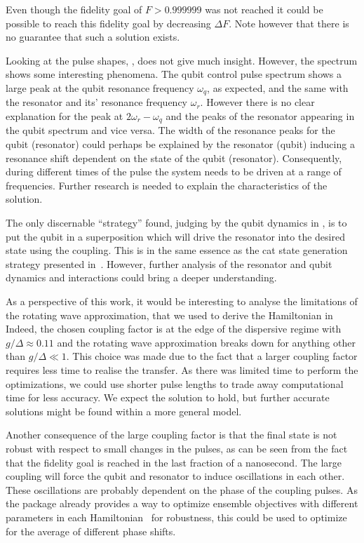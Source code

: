 \documentclass[main.tex]{subfiles}
\begin{document}
Even though the fidelity goal of \(F > 0.999999\) was not reached it could be possible to reach this fidelity goal by decreasing \(\Delta F\).
Note however that there is no guarantee that such a solution exists.

Looking at the pulse shapes, , does not give much insight. However, the spectrum shows some interesting phenomena.
The qubit control pulse spectrum shows a large peak at the qubit resonance frequency \(\omega_q\), as expected, and the same with the resonator and its' resonance frequency \(\omega_r\).
However there is no clear explanation for the peak at \(2\omega_r-\omega_q\) and the peaks of the resonator appearing in the qubit spectrum and vice versa.
The width of the resonance peaks for the qubit (resonator) could perhaps be explained by the resonator (qubit) inducing a resonance shift dependent on the state of the qubit (resonator).
Consequently, during different times of the pulse the system needs to be driven at a range of frequencies.
Further research is needed to explain the characteristics of the solution.

The only discernable ``strategy'' found, judging by the qubit dynamics in , is to put the qubit in a superposition which will drive the resonator into the desired state using the coupling.
This is in the same essence as the cat state generation strategy presented in~\cite{haroche_exploring_2006}.
However, further analysis of the resonator and qubit dynamics and interactions could bring a deeper understanding.

As a perspective of this work, it would be interesting to analyse the limitations of the rotating wave approximation, that we used to derive the Hamiltonian in 
Indeed, the chosen coupling factor is at the edge of the dispersive regime with \(g/\Delta\approx 0.11\) and the rotating wave approximation breaks down for anything other than \(g/\Delta \ll 1\).
This choice was made due to the fact that a larger coupling factor requires less time to realise the transfer. As there was limited time to perform the optimizations, we could use shorter pulse lengths to trade away computational time for less accuracy.
We expect the solution to hold, but further accurate solutions might be found within a more general model.

Another consequence of the large coupling factor is that the final state is not robust with respect to small changes in the pulses, as can be seen from the fact that the fidelity goal is reached in the last fraction of a nanosecond.
The large coupling will force the qubit and resonator to induce oscillations in each other.
These oscillations are probably dependent on the phase of the coupling pulses.
As the \krotov{} package already provides a way to optimize ensemble objectives with different parameters in each Hamiltonian~\cite{goerz_robustness_2014} for robustness, this could be used to optimize for the average of different phase shifts.
\end{document}
